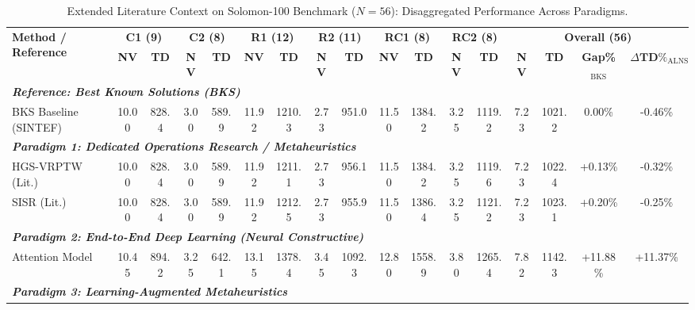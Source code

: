 \begin{table}[!htbp]
\caption{Extended Literature Context on Solomon-100 Benchmark ($N=56$): Disaggregated Performance Across Paradigms.}
\label{tab:supp_lit_context}
\centering
\scriptsize
\setlength{\tabcolsep}{2.5pt}
\begin{tabular*}{\textwidth}{@{\extracolsep{\fill}} l cc cc cc cc cc cc cccc @{}}
\toprule
\multirow{2}{*}{\textbf{Method / Reference}} & \multicolumn{2}{c}{\textbf{C1 (9)}} & \multicolumn{2}{c}{\textbf{C2 (8)}} & \multicolumn{2}{c}{\textbf{R1 (12)}} & \multicolumn{2}{c}{\textbf{R2 (11)}} & \multicolumn{2}{c}{\textbf{RC1 (8)}} & \multicolumn{2}{c}{\textbf{RC2 (8)}} & \multicolumn{4}{c}{\textbf{Overall (56)}} \\
\cmidrule(lr){2-3} \cmidrule(lr){4-5} \cmidrule(lr){6-7} \cmidrule(lr){8-9} \cmidrule(lr){10-11} \cmidrule(lr){12-13} \cmidrule(lr){14-17}
 & \textbf{NV} & \textbf{TD} & \textbf{NV} & \textbf{TD} & \textbf{NV} & \textbf{TD} & \textbf{NV} & \textbf{TD} & \textbf{NV} & \textbf{TD} & \textbf{NV} & \textbf{TD} & \textbf{NV} & \textbf{TD} & \textbf{Gap\%}$_{\text{BKS}}$ & $\Delta\textbf{TD}\%_{\text{ALNS}}$ \\
\midrule
\multicolumn{17}{l}{\textit{\textbf{Reference: Best Known Solutions (BKS)}}} \\
BKS Baseline (SINTEF) & 10.00 & 828.4 & 3.00 & 589.9 & 11.92 & 1210.3 & 2.73 & 951.0 & 11.50 & 1384.2 & 3.25 & 1119.2 & 7.23 & 1021.2 & 0.00\% & -0.46\% \\
\midrule
\multicolumn{17}{l}{\textit{\textbf{Paradigm 1: Dedicated Operations Research / Metaheuristics}}} \\
HGS-VRPTW \cite{vidal2013hybrid} (Lit.) & 10.00 & 828.4 & 3.00 & 589.9 & 11.92 & 1211.1 & 2.73 & 956.1 & 11.50 & 1384.2 & 3.25 & 1119.6 & 7.23 & 1022.4 & +0.13\% & -0.32\% \\
SISR \cite{christiaens2020slack} (Lit.) & 10.00 & 828.4 & 3.00 & 589.9 & 11.92 & 1212.5 & 2.73 & 955.9 & 11.50 & 1386.4 & 3.25 & 1121.2 & 7.23 & 1023.1 & +0.20\% & -0.25\% \\
\midrule
\multicolumn{17}{l}{\textit{\textbf{Paradigm 2: End-to-End Deep Learning (Neural Constructive)}}} \\
Attention Model \cite{kool2019attention,falkner2020learning} & 10.45 & 894.2 & 3.25 & 642.1 & 13.15 & 1378.4 & 3.45 & 1092.3 & 12.80 & 1558.9 & 3.80 & 1265.4 & 7.82 & 1142.3 & +11.88\% & +11.37\% \\
\midrule
\multicolumn{17}{l}{\textit{\textbf{Paradigm 3: Learning-Augmented Metaheuristics}}} \\

\end{tabular*}
\end{table}
